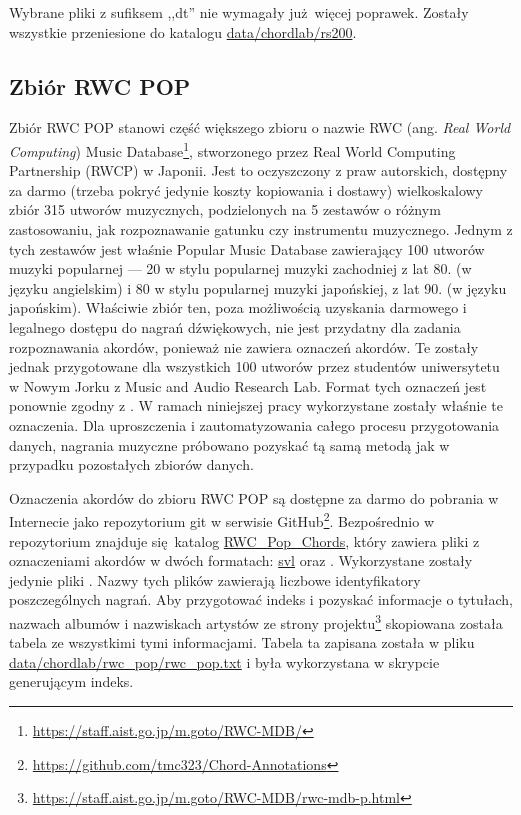 Wybrane pliki z sufiksem ,,dt'' nie wymagały już więcej poprawek. Zostały wszystkie przeniesione do katalogu \url{data/chordlab/rs200}.

\subsection{Zbiór RWC POP}

Zbiór RWC POP \cite{goto_rwc_nodate} stanowi część większego zbioru o nazwie RWC (ang. \emph{Real World Computing}) Music Database\footnote{\url{https://staff.aist.go.jp/m.goto/RWC-MDB/}}, stworzonego przez Real World Computing Partnership (RWCP) w Japonii. Jest to oczyszczony z praw autorskich, dostępny za darmo (trzeba pokryć jedynie koszty kopiowania i dostawy) wielkoskalowy zbiór 315 utworów muzycznych, podzielonych na 5 zestawów o różnym zastosowaniu, jak rozpoznawanie gatunku czy instrumentu muzycznego. Jednym z tych zestawów jest właśnie Popular Music Database zawierający 100 utworów muzyki popularnej --- 20 w stylu popularnej muzyki zachodniej z lat 80. (w języku angielskim) i 80 w stylu popularnej muzyki japońskiej, z lat 90. (w języku japońskim). Właściwie zbiór ten, poza możliwością uzyskania darmowego i legalnego dostępu do nagrań dźwiękowych, nie jest przydatny dla zadania rozpoznawania akordów, ponieważ nie zawiera oznaczeń akordów. Te zostały jednak przygotowane dla wszystkich 100 utworów przez studentów uniwersytetu w Nowym Jorku z Music and Audio Research Lab. Format tych oznaczeń jest ponownie zgodny z \cite{harte_towards_nodate}. W ramach niniejszej pracy wykorzystane zostały właśnie te oznaczenia.  Dla uproszczenia i zautomatyzowania całego procesu przygotowania danych, nagrania muzyczne próbowano pozyskać tą samą metodą jak w przypadku pozostałych zbiorów danych.

Oznaczenia akordów do zbioru RWC POP są dostępne za darmo do pobrania w Internecie jako repozytorium git w serwisie GitHub\footnote{\url{https://github.com/tmc323/Chord-Annotations}}. Bezpośrednio w repozytorium znajduje się katalog \url{RWC_Pop_Chords}, który zawiera pliki z oznaczeniami akordów w dwóch formatach: \url{svl} oraz . Wykorzystane zostały jedynie pliki . Nazwy tych plików zawierają liczbowe identyfikatory poszczególnych nagrań. Aby przygotować indeks i pozyskać informacje o tytułach, nazwach albumów i nazwiskach artystów ze strony projektu\footnote{\url{https://staff.aist.go.jp/m.goto/RWC-MDB/rwc-mdb-p.html}} skopiowana została tabela ze wszystkimi tymi informacjami. Tabela ta zapisana została w pliku \url{data/chordlab/rwc_pop/rwc_pop.txt} i była wykorzystana w skrypcie generującym indeks.

